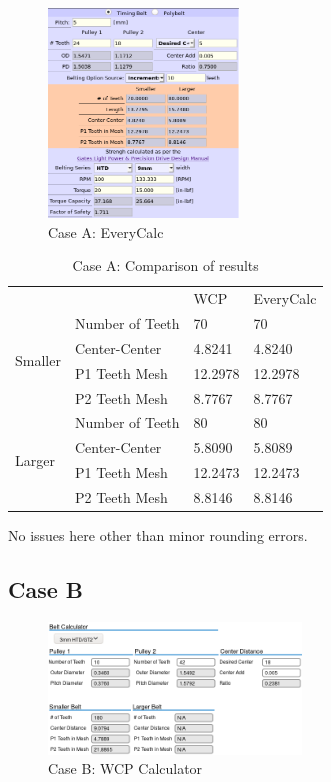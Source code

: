 \documentclass[10pt,letterpaper]{article}
\begin{document}
	\begin{figure}[H]
		\includegraphics[width=0.45\textwidth]{validation/belts_EC_A.png}
		\caption{Case A: EveryCalc}
	\end{figure}

	\begin{table}[H]
	\begin{tabular}{llll}
	                  &                 & WCP & EveryCalc \\ \cline{1-4} 
	\multirow{4}{*}{Smaller} & Number of Teeth & 70      & 70      \\
			                 & Center-Center   & 4.8241  & 4.8240  \\
			                 & P1 Teeth Mesh   & 12.2978 & 12.2978 \\
			                 & P2 Teeth Mesh   & 8.7767  & 8.7767  \\ \cline{1-4} 
	\multirow{4}{*}{Larger}  & Number of Teeth & 80      & 80      \\
			                 & Center-Center   & 5.8090  & 5.8089  \\
			                 & P1 Teeth Mesh   & 12.2473 & 12.2473 \\
			                 & P2 Teeth Mesh   & 8.8146  & 8.8146  
	\end{tabular}
	\caption{Case A: Comparison of results}
	\end{table}

	No issues here other than minor rounding errors.

	\newpage

	\subsection*{Case B}

	\begin{figure}[H]
		\includegraphics[width=0.60\textwidth]{validation/belts_WCP_B.png}
		\caption{Case B: WCP Calculator}
	\end{figure}
\end{document}
